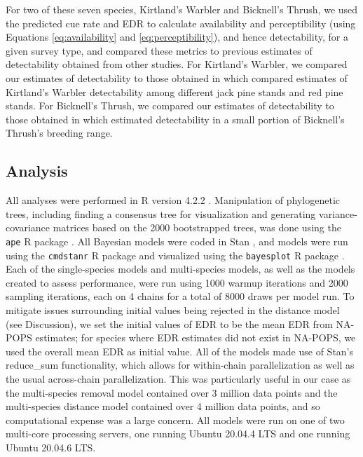 \documentclass[12pt]{article}
\begin{document}
\par For two of these seven species, Kirtland's Warbler and Bicknell's Thrush, we used the predicted cue rate and EDR to calculate availability and perceptibility (using Equations \ref{eq:availability} and \ref{eq:perceptibility}), and hence detectability, for a given survey type, and compared these metrics to previous estimates of detectability obtained from other studies.
For Kirtland's Warbler, we compared our estimates of detectability to those obtained in \citet{van_dyke_comparative_2022} which compared estimates of Kirtland's Warbler detectability among different jack pine stands and red pine stands.
For Bicknell's Thrush, we compared our estimates of detectability to those obtained in \citet{aubry_bicknells_2018} which estimated detectability in a small portion of Bicknell's Thrush's breeding range.

\subsection{Analysis}
\par All analyses were performed in R version 4.2.2 \citep{r_core_team_r_2022}.
Manipulation of phylogenetic trees, including finding a consensus tree for visualization and generating variance-covariance matrices based on the 2000 bootstrapped trees, was done using the \texttt{ape} R package \citep{paradis_ape_2019}.
All Bayesian models were coded in Stan \citep{stan_development_team_stan_2024}, and models were run using the \texttt{cmdstanr} R package \citep{gabry_cmdstanr_2023} and visualized using the \texttt{bayesplot} R package \citep{gabry_visualization_2019}.
Each of the single-species models and multi-species models, as well as the models created to assess performance, were run using 1000 warmup iterations and 2000 sampling iterations, each on 4 chains for a total of 8000 draws per model run.
To mitigate issues surrounding initial values being rejected in the distance model (see Discussion), we set the initial values of EDR to be the mean EDR from NA-POPS \citep{edwards_point_2023} estimates; for species where EDR estimates did not exist in NA-POPS, we used the overall mean EDR as initial value.
All of the models made use of Stan's reduce\_sum functionality, which allows for within-chain parallelization as well as the usual across-chain parallelization.
This was particularly useful in our case as the multi-species removal model contained over 3 million data points and the multi-species distance model contained over 4 million data points, and so computational expense was a large concern.
All models were run on one of two multi-core processing servers, one running Ubuntu 20.04.4 LTS and one running Ubuntu 20.04.6 LTS.
\end{document}

